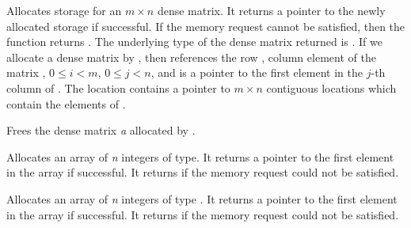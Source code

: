 \documentclass[letterpaper,10pt,english]{sphinxmanual}
\begin{document}
\begin{fulllineitems}
\label{linear_solvers/DLS:newDenseMat}
Allocates storage for an $m \times n$ dense matrix. It
returns a pointer to the newly allocated storage if successful. If
the memory request cannot be satisfied, then the function returns
.  The underlying type of the dense matrix returned is
. If we allocate a dense matrix  by
, then  references the row ,
column  element of the matrix , $0 \le i < m$,
$0 \le j < n$, and  is a pointer to the first element
in the $j$-th column of . The location  contains
a pointer to $m \times n$ contiguous locations which contain
the elements of .

\end{fulllineitems}


\begin{fulllineitems}
\label{linear_solvers/DLS:destroyMat}
Frees the dense matrix \emph{a} allocated by {\hyperref[linear_solvers/DLS:newDenseMat]{}}.

\end{fulllineitems}


\begin{fulllineitems}
\label{linear_solvers/DLS:newLintArray}
Allocates an array of \emph{n} integers of  type.  It
returns a pointer to the first element in the array if
successful. It returns  if the memory request could not be
satisfied.

\end{fulllineitems}


\begin{fulllineitems}
\label{linear_solvers/DLS:newIntArray}
Allocates an array of \emph{n} integers of type .  It returns a
pointer to the first element in the array if successful. It returns
 if the memory request could not be satisfied.

\end{fulllineitems}
\end{document}
